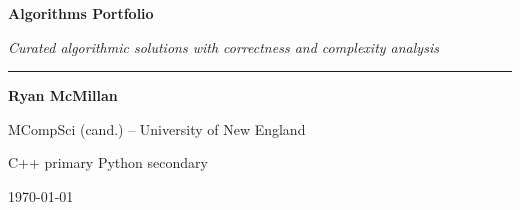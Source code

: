 \begin{titlepage}
  \centering
  \vspace*{2.2cm}

  {\Huge\bfseries Algorithms Portfolio\par}
  \vspace{0.35cm}

  {\large\itshape Curated algorithmic solutions with correctness and complexity analysis\par}

  \vspace{0.9cm}
  \rule{0.72\textwidth}{0.4pt}
  \vspace{0.9cm}

  {\Large\bfseries Ryan McMillan\par}
  \vspace{0.2cm}
  {\normalsize MCompSci (cand.) -- University of New England\par}

  \vspace{0.8cm}
  {\normalsize C++ primary \;\textbullet\; Python secondary\par}

  \vfill

  {\normalsize \today\par}
\end{titlepage}

